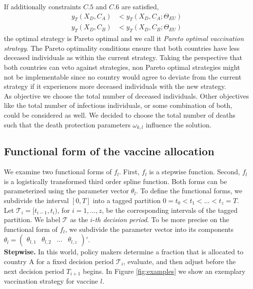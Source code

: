 If additionally constraints $C.5$ and $C.6$ are satisfied, 
\begin{align}
y_T(X_D, C_A) &< y_T(X_D, C_A; \Theta_{EU}) \tag{C.5} \\
y_T(X_D, C_B) &< y_T(X_D, C_B; \Theta_{EU}) \tag{C.6}
\end{align}
the optimal strategy is Pareto optimal and we call it \textit{Pareto optimal vaccination strategy}. The Pareto optimality conditions ensure that both countries have less deceased individuals as within the current strategy. Taking the perspective that both countries can veto against strategies, non Pareto optimal strategies might not be implementable since no country would agree to deviate from the current strategy if it experiences more deceased individuals with the new strategy.\\

As objective we choose the total number of deceased individuals. Other objectives like the total number of infectious individuals, or some combination of both, could be considered as well. We decided to choose the total number of deaths such that the death protection parameters $\omega_{k,l}$ influence the solution. \\

\subsection{Functional form of the vaccine allocation}
We examine two functional forms of $f_{l}$. First, $f_{l}$ is a stepwise function. Second, $f_{l}$ is a logistically transformed third order spline function. Both forms can be parameterized using the parameter vector $\theta_l$.
To define the functional forms, we subdivide the interval $[0,T]$ into a tagged partition $0=t_0 < t_1 < \dots < t_z = T$. Let $\mathcal{T}_i = [t_{i-1}, t_{i})$, for $i = 1, \dots, z$, be the corresponding intervals of the tagged partition. We label $\mathcal{T}$ as the $i$-\textit{th decision period}. To be more precise on the functional form of $f_l$, we subdivide the parameter vector into its components $\theta_l = \begin{pmatrix}
\theta_{l,1}  & \theta_{l,2} & \dots & \theta_{l,z} \end{pmatrix}'$. \\

\textbf{Stepwise.} In this world, policy makers determine a fraction that is allocated to country A for a fixed decision period $\mathcal{T}_i$, evaluate, and then adjust before the next decision period $T_{i+1}$ begins. In Figure \ref{fig:examples} we show an exemplary vaccination strategy for vaccine $l$.

